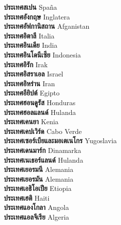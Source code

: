 \textbf{ ประเทศสเปน  } Spaña \\
\textbf{ ประเทศอังกฤษ  } Inglatera \\
\textbf{ ประเทศอัฟกานิสถาน  } Afganistan \\
\textbf{ ประเทศอิตาลี  } Italia \\
\textbf{ ประเทศอินเดีย  } India \\
\textbf{ ประเทศอินโดนีเซีย  } Indonesia \\
\textbf{ ประเทศอิรัก  } Irak \\
\textbf{ ประเทศอิสราเอล  } Israel \\
\textbf{ ประเทศอิหร่าน  } Iran \\
\textbf{ ประเทศอียิปต์  } Egipto \\
\textbf{ ประเทศฮอนดูรัส  } Honduras \\
\textbf{ ประเทศฮอลแลนด์  } Hulanda \\
\textbf{ ประเทศเคนยา  } Kenia \\
\textbf{ ประเทศเคปเวิร์ด  } Cabo Verde \\
\textbf{ ประเทศเซอร์เบียและมอเตเนโกร  } Yugoslavia \\
\textbf{ ประเทศเดนมาร์ก  } Dinamarka \\
\textbf{ ประเทศเนเธอร์แลนด์  } Hulanda \\
\textbf{ ประเทศเยอรมนี  } Alemania \\
\textbf{ ประเทศเยอรมัน  } Alemania \\
\textbf{ ประเทศเอธิโอเปีย  } Etiopia \\
\textbf{ ประเทศเฮติ  } Haiti \\
\textbf{ ประเทศแองโกลา  } Angola \\
\textbf{ ประเทศแอลจีเรีย  } Algeria \\
